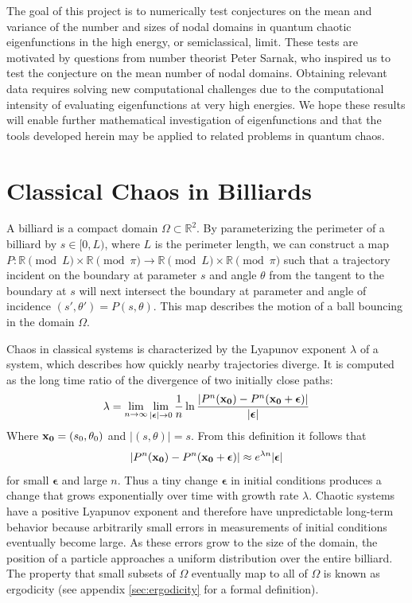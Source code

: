 \documentclass{report}
\begin{document}
The goal of this project is to numerically test conjectures on the mean and variance of the number and sizes of nodal domains in quantum chaotic eigenfunctions in the high energy, or semiclassical, limit. These tests are motivated by questions from number theorist Peter Sarnak, who inspired us to test the conjecture on the mean number of nodal domains. Obtaining relevant data requires solving new computational challenges due to the computational intensity of evaluating eigenfunctions at very high energies. We hope these results will enable further mathematical investigation of eigenfunctions and that the tools developed herein may be applied to related problems in quantum chaos.

\section{Classical Chaos in Billiards}
\label{sec:classical}
A billiard is a compact domain $\Omega \subset \mathbb{R}^{2}$. By parameterizing the perimeter of a billiard by $s \in [0,L)$, where $L$ is the perimeter length, we can construct a map $P: \mathbb{R} \pmod{L} \times \mathbb{R} \pmod{\pi} \rightarrow \mathbb{R} \pmod{L} \times \mathbb{R} \pmod{\pi}$ such that a trajectory incident on the boundary at parameter $s$ and angle $\theta$ from the tangent to the boundary at $s$ will next intersect the boundary at parameter and angle of incidence $(s', \theta') = P(s, \theta)$. This map describes the motion of a ball bouncing in the domain $\Omega$.

Chaos in classical systems is characterized by the Lyapunov exponent $\lambda$ of a system, which describes how quickly nearby trajectories diverge. It is computed as the long time ratio of the divergence of two initially close paths:
\[
\lambda = \lim_{n \to \infty} \lim_{\vert \boldsymbol\epsilon \vert \to 0} \frac{1}{n} \ln{\frac{\vert P^{n}({\bf x_{0}}) - P^{n}({\bf x_{0}} + \boldsymbol\epsilon) \vert}{\vert \boldsymbol\epsilon \vert}}
\]
Where ${\bf x_{0}} = (s_{0}, \theta_{0})$ and $\vert (s, \theta) \vert = s$. From this definition it follows that
\[
\vert P^{n}({\bf x_{0}}) - P^{n}({\bf x_{0}} + \boldsymbol\epsilon) \vert \approx e^{\lambda n} \vert \boldsymbol\epsilon \vert
\]
for small $\boldsymbol\epsilon$ and large $n$. Thus a tiny change $\boldsymbol\epsilon$ in initial conditions produces a change that grows exponentially over time with growth rate $\lambda$. Chaotic systems have a positive Lyapunov exponent and therefore have unpredictable long-term behavior because arbitrarily small errors in measurements of initial conditions eventually become large. As these errors grow to the size of the domain, the position of a particle approaches a uniform distribution over the entire billiard. The property that small subsets of $\Omega$ eventually map to all of $\Omega$ is known as ergodicity (see appendix \ref{sec:ergodicity} for a formal definition).
\end{document}
